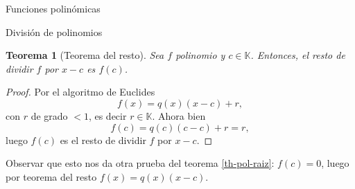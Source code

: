\documentclass[a4paper,12pt,twoside,spanish]{amsbook}
\newtheorem{teorema}{Teorema}[section]
\theoremstyle{definition}
\theoremstyle{remark}
\newcommand{\K}{\mathbb K}
\begin{document}
\begin{chapter}{Funciones polinómicas}
\begin{section}{División de polinomios}
\begin{teorema}[Teorema del  resto] Sea $f$ polinomio y $c \in \K$. Entonces,  el resto de dividir $f$ por $x-c$ es $f(c)$. 
\end{teorema}
\begin{proof} Por  el algoritmo de Euclides
	\begin{equation*}
		f(x) = q(x)(x-c) + r,
	\end{equation*}
	con $r$ de grado $<1$,  es decir $r \in \K$.  Ahora bien
	\begin{equation*}
	f(c) = q(c)(c-c) + r = r,
	\end{equation*}
	luego $f(c)$  es el resto de dividir $f$ por $x-c$. 
\end{proof}

Observar que esto  nos da otra prueba del teorema \ref{th-pol-raiz}: $f(c)=0$, luego por teorema del resto $ f(x)=q(x)(x-c)$. 
		
	\end{section}	
	\end{chapter}	
\end{document}
